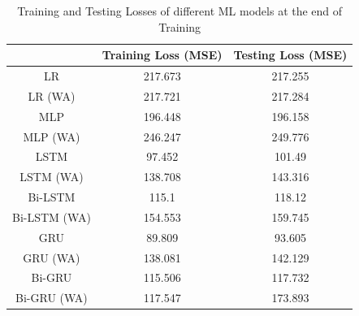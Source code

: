 \begin{table}[p]
    \vspace{-2cm}
    \centering
    \begin{minipage}{\textwidth}
        \centering
        \renewcommand{\arraystretch}{1.5}
        \begin{tabular}{ |c|c|c| }
            \hline
            & Training Loss (MSE)        & Testing Loss (MSE)          \\
            \hline
            LR           & \cellcolor{red!10}217.673  & \cellcolor{red!10}217.255   \\
            \hline
            LR (WA)      & \cellcolor{red!20}217.721  & \cellcolor{red!20}217.284   \\
            \hline
            MLP          & 196.448                    & 196.158                     \\
            \hline
            MLP (WA)     & \cellcolor{red!30}246.247  & \cellcolor{red!30}249.776   \\
            \hline
            LSTM         & \cellcolor{green!20}97.452 & \cellcolor{green!20}101.49  \\
            \hline
            LSTM (WA)    & 138.708                    & 143.316                     \\
            \hline
            Bi-LSTM      & \cellcolor{green!10}115.1  & 118.12                      \\
            \hline
            Bi-LSTM (WA) & 154.553                    & 159.745                     \\
            \hline
            GRU          & \cellcolor{green!30}89.809 & \cellcolor{green!30}93.605  \\
            \hline
            GRU (WA)     & 138.081                    & 142.129                     \\
            \hline
            Bi-GRU       & 115.506                    & \cellcolor{green!10}117.732 \\
            \hline
            Bi-GRU (WA)  & 117.547                    & 173.893                     \\
            \hline
        \end{tabular}
        \captionsetup{format=plain, justification=centering, font=small}
        \vspace{-0.2cm}
        \caption{Training and Testing Losses of different ML models at the end of Training}
        \label{tab:train_test_mse}

\end{minipage}
\end{table}
